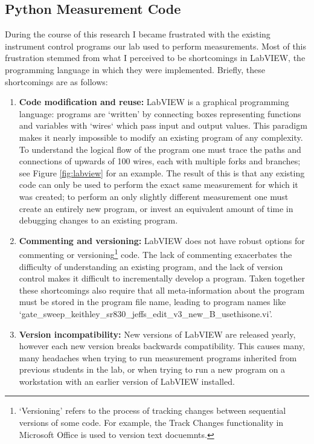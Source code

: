 \documentclass[edeposit,fullpage,draftthesis]{uiucthesis2009}
\begin{document}
\begin{appendices}
\chapter{Python Measurement Code}

During the course of this research I became frustrated with the existing instrument control programs
our lab used to perform measurements.
Most of this frustration stemmed from what I perceived to be shortcomings in LabVIEW, the programming
language in which they were implemented. Briefly, these shortcomings are as follows:

    \begin{enumerate}
        \item \textbf{Code modification and reuse:} LabVIEW is a graphical programming language: 
            programs are `written' by connecting boxes representing functions and variables with `wires` which
            pass input and output values. This paradigm makes it nearly impossible to modify
            an existing program of any complexity. To understand the logical flow of the program
            one must trace the paths and connections of upwards of 100 wires, each with multiple forks
            and branches; see Figure \ref{fig:labview} for an example. 
            The result of this is that any existing code can only be used to
            perform the exact same measurement for which it was created; to perform an only slightly 
            different measurement one must create an entirely new program, or invest an equivalent 
            amount of time in debugging changes to an existing program.
        \item \textbf{Commenting and versioning:} LabVIEW does not have robust options for commenting
            or versioning\footnote{`Versioning' refers to the process of tracking changes
            between sequential versions of some code. For example, the Track Changes functionality in Microsoft
            Office is used to version text docuemnts.} code. The lack of commenting exacerbates the difficulty of understanding
            an existing program, and the lack of version control makes it difficult to incrementally
            develop a program. Taken together these shortcomings also require that all meta-information about the
            program must be stored in the program file name, leading to program names like 
            `gate\_sweep\_keithley\_sr830\_jeffs\_edit\_v3\_new\_B\_usethisone.vi'.
        \item \textbf{Version incompatibility:} New versions of LabVIEW are released 
            yearly, however each new version breaks backwards compatibility.
            This causes many, many headaches when trying to run measurement programs inherited
            from previous students in the lab, or when trying to run a new program on a workstation
            with an earlier version of LabVIEW installed.
    \end{enumerate}
        

\end{appendices}
\end{document}

